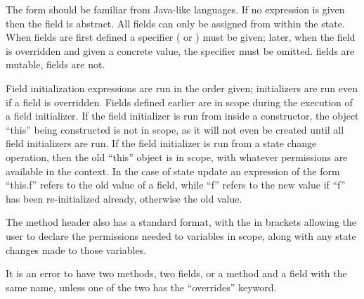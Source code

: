 The  form should be familiar from Java-like
languages.  If no expression is given then the field is abstract.  All
fields can only be assigned from within the
state. 
When fields are first defined a specifier ( or )
must be given; later, when the field is overridden and given a concrete
value, the specifier must be omitted.
 fields are mutable,  fields
are not.

Field initialization expressions are run in the order given;
initializers are run even if a field is overridden.  Fields defined
earlier are in scope during the execution of a field initializer.
If the field initializer is run from inside a constructor, the
object ``this'' being constructed is not in scope, as it will not
even be created until all field initializers are run.  If the field
initializer is run from a state change operation, then the old ``this''
object is in scope, with whatever permissions are available in the
context.  In the case of state update an expression of the form ``this.f''
refers to the old value of a field, while ``f'' refers to the new value
if ``f'' has been re-initialized already, otherwise the old value.



The method header  also has a standard
format, with the  in brackets allowing the user to declare
the permissions needed to variables in scope, along with any state
changes made to those variables.



It is an error to have two methods, two fields, or a method and a
field with the same name, unless one of the two has the ``overrides''
keyword.

